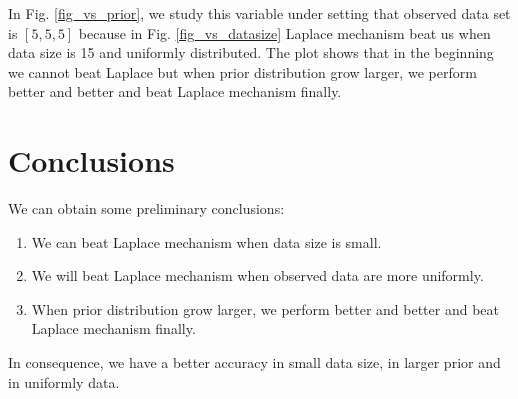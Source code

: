 \documentclass[sigconf, anonymous]{acmart}
\begin{document}
In Fig. \ref{fig_vs_prior}, we study this variable under setting that observed data set is $[5,5,5]$ because in Fig. \ref{fig_vs_datasize} Laplace mechanism beat us when data size is 15 and uniformly distributed. The plot shows that in the beginning we cannot beat Laplace but when prior distribution grow larger, we perform better and better and beat Laplace mechanism finally.







\section{Conclusions}
We can obtain some preliminary conclusions: 
\begin{enumerate}
	\item We can beat Laplace mechanism when data size is small.
	\item We will beat Laplace mechanism when observed data are more uniformly.
  \item When prior distribution grow larger, we perform better and better and beat Laplace mechanism finally.
\end{enumerate} 

In consequence, we have a better accuracy in small data size, in larger prior and in uniformly data.





\end{document}
